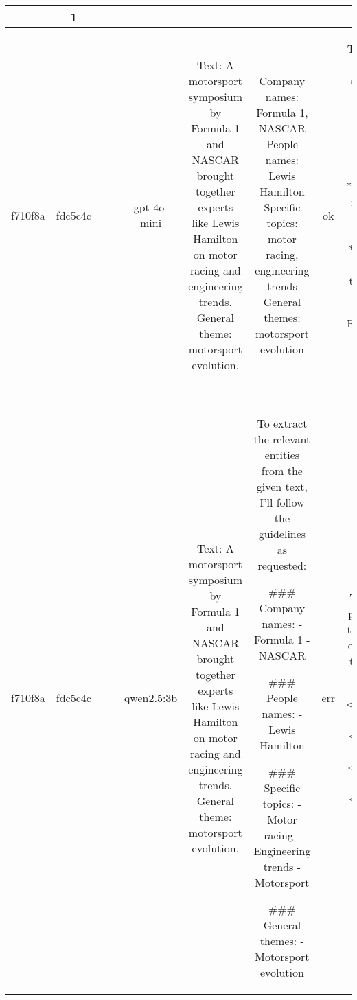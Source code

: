 \begin{table}[h!]
\begin{tabular}{|c|c|c|c|c|c|c|c|c|c|}
{This misalignment with the desired format leads to a non-compliance decision.

ERR & 1\\
\hline
f710f8a & fdc5c4c &  &  & gpt-4o-mini & Text: A motorsport symposium by Formula 1 and NASCAR brought together experts like Lewis Hamilton on motor racing and engineering trends. General theme: motorsport evolution. & Company names: Formula 1, NASCAR  
People names: Lewis Hamilton  
Specific topics: motor racing, engineering trends  
General themes: motorsport evolution   & ok & The chatbot output must be evaluated based on its adherence to the format and structure specified in the description. The output should have four sections: Company names, People names, Specific topics, and General themes, each followed by a comma-separated list of entries for the respective category.

The output complies in the following ways:
1. **Company names** are listed under "Company names" and separated by commas: "Formula 1, NASCAR".
2. **People names** are listed under "People names": "Lewis Hamilton".
3. **Specific topics** are accurately labeled under "Specific topics": "motor racing, engineering trends".
4. **General themes** are listed under "General themes": "motorsport evolution".

Each section is distinct and formatted according to the guidelines (the list is comma-separated and each section is labeled properly). 

No violation.
OK & 1\\
\hline
f710f8a & fdc5c4c &  &  & qwen2.5:3b & Text: A motorsport symposium by Formula 1 and NASCAR brought together experts like Lewis Hamilton on motor racing and engineering trends. General theme: motorsport evolution. & To extract the relevant entities from the given text, I'll follow the guidelines as requested:

### Company names:
- Formula 1
- NASCAR

### People names:
- Lewis Hamilton

### Specific topics:
- Motor racing
- Engineering trends
- Motorsport

### General themes:
- Motorsport evolution & err & The chatbot output is structured in a way that partially follows the desired format described in the guidelines, using headings to categorize each element. However, it does not fully comply with the specified format. The expected structure is:

- Company Names: <comma_separated_list_of_company_names>
- People Names: <comma_separated_list_of_people_names>
- Specific Topics: <comma_separated_list_of_specific_topics>
- General Themes: <comma_separated_list_of_general_themes>

}
\end{tabular}
\end{table}
